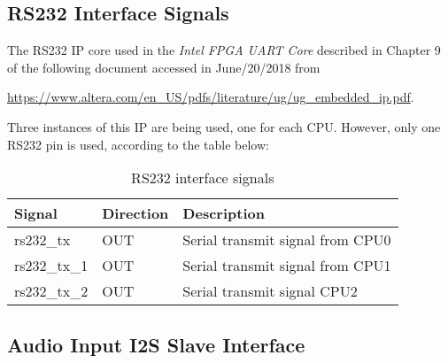 \documentclass{ug}
\theoremstyle{plain}
\begin{document}
\subsection{RS232 Interface Signals}

The RS232 IP core used in the {\it Intel FPGA UART Core} described in Chapter 9
of the following document accessed in June/20/2018 from

\hyperlink{https://www.altera.com/en\_US/pdfs/literature/ug/ug\_embedded\_ip.pdf}{https://www.altera.com/en\_US/pdfs/literature/ug/ug\_embedded\_ip.pdf}.

Three instances of this IP are being used, one for each CPU. However, only one
RS232 pin is used, according to the table below:

\begin{table}[H]
  \begin{center}
    \begin{tabular}{|l|l|p{8cm}|}
      \hline
      \rowcolor{iob-green}
      \textbf{Signal} & \textbf{Direction} & \textbf{Description} \\
      \hline
      \hline

      rs232\_tx &  OUT & Serial transmit signal from CPU0\\
      \hline

      rs232\_tx\_1 &  OUT & Serial transmit signal from CPU1\\
      \hline

      rs232\_tx\_2 &  OUT & Serial transmit signal CPU2\\
      \hline

    \end{tabular}
    \caption{RS232 interface signals}
    \label{tab:rs232}
  \end{center}
\end{table}
\clearpage

\subsection{Audio Input I2S Slave Interface}
\end{document}
